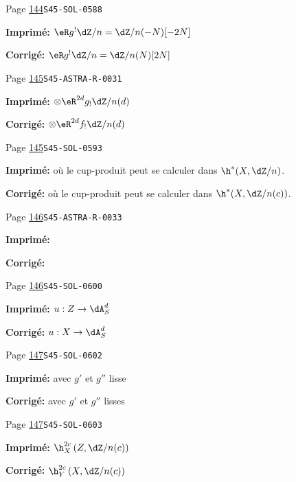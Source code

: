 \begin{description}
\smallskip
\item[\hypertarget{apparatus:FR-0102}{102}] Page \hyperlink{printpage:fr:144}{144}\quad\texttt{S45-SOL-0588}
\par\noindent\textbf{Imprimé:} \(\eR g^! \dZ/n=\dZ/n(-N)[-2 N]\)
\par\noindent\textbf{Corrigé:} \(\eR g^! \dZ/n=\dZ/n(N)[2 N]\)
\smallskip
\item[\hypertarget{apparatus:FR-0103}{103}] Page \hyperlink{printpage:fr:145}{145}\quad\texttt{S45-ASTRA-R-0031}
\par\noindent\textbf{Imprimé:} \(\otimes \eR^{2 d} g_!\dZ/n(d)\)
\par\noindent\textbf{Corrigé:} \(\otimes \eR^{2 d} f_!\dZ/n(d)\)
\smallskip
\item[\hypertarget{apparatus:FR-0104}{104}] Page \hyperlink{printpage:fr:145}{145}\quad\texttt{S45-SOL-0593}
\par\noindent\textbf{Imprimé:} où le cup-produit peut se calculer dans $\h^*(X,\dZ/n)$.
\par\noindent\textbf{Corrigé:} où le cup-produit peut se calculer dans $\h^*(X,\dZ/n(c))$.
\smallskip
\item[\hypertarget{apparatus:FR-0105}{105}] Page \hyperlink{printpage:fr:146}{146}\quad\texttt{S45-ASTRA-R-0033}
\par\noindent\textbf{Imprimé:} 
\par\noindent\textbf{Corrigé:} 
\smallskip
\item[\hypertarget{apparatus:FR-0106}{106}] Page \hyperlink{printpage:fr:146}{146}\quad\texttt{S45-SOL-0600}
\par\noindent\textbf{Imprimé:} \(u:Z\to \dA_S^d\)
\par\noindent\textbf{Corrigé:} \(u:X\to \dA_S^d\)
\smallskip
\item[\hypertarget{apparatus:FR-0107}{107}] Page \hyperlink{printpage:fr:147}{147}\quad\texttt{S45-SOL-0602}
\par\noindent\textbf{Imprimé:} avec $g'$ et $g''$ lisse
\par\noindent\textbf{Corrigé:} avec $g'$ et $g''$ lisses
\smallskip
\item[\hypertarget{apparatus:FR-0108}{108}] Page \hyperlink{printpage:fr:147}{147}\quad\texttt{S45-SOL-0603}
\par\noindent\textbf{Imprimé:} \(\h_X^{2 c}\left(Z,\dZ/n(c)\right)\)
\par\noindent\textbf{Corrigé:} \(\h_Y^{2 c}\left(X,\dZ/n(c)\right)\)

\end{description}
